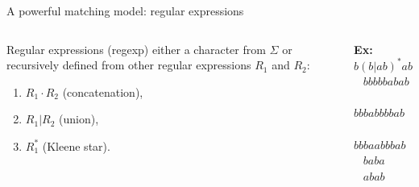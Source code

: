 \begin{frame}{A powerful matching model: regular expressions}
    \begin{columns}
        \begin{mydefblock}{Regular expressions (regexp)}
            either a character from $\Sigma$ or recursively defined from other regular expressions $R_1$ and $R_2$:
            \begin{enumerate}
                \item $R_1 \cdot R_2$ (concatenation),
                \item $R_1 | R_2$ (union),
                \item $R_1^\ast$ (Kleene star).
            \end{enumerate}
        \end{mydefblock}
        \pause
        \begin{center}
                \textbf{Ex:} $b(b|ab)^\ast ab$\\
                \smallskip
                \cmark ~ $bbbbbabab$ \\
                \cmark ~ $bbbabbbbab$\\
                \xmark ~ $bbbaabbbab$\\
                \xmark ~ $baba$\\ 
                \xmark ~ $abab$\\
        \end{center}
    \end{columns}    


\end{frame}
